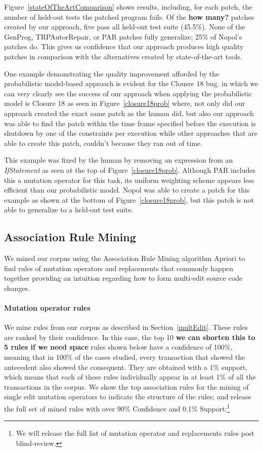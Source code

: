 \documentclass[conference]{IEEEtran}
\newcommand{\todo}[1]
  {{\scriptsize \textbf{\color{red} {#1}}}}
\begin{document}
Figure~\ref{stateOfTheArtComparison} shows results, including, for each patch,
the number of held-out tests the patched program fails. Of the \todo{how many?}
patches created by our approach, 
five pass all held-out test suite (45.5\%). None of the GenProg,
TRPAutorRepair, or PAR patches fully generalize; 25\% of Nopol's patches do.
This gives us confidence that our approach produces high
quality patches in comparison with the alternatives created by state-of-the-art
tools. 

One example demonstrating the quality improvement afforded by the probabilistic
model-based approach is evident for the Clousre 18 bug.  in which we can very clearly see the success of our approach when
applying the probabilistic model is Closure 18 as seen in
Figure~\ref{closure18prob} where, not only did our approach created the exact
same patch as the human did, but also our approach was able to find the patch
within the time frame specified before the execution is shutdown by one of the
constraints per execution while other approaches that are able to create this
patch, couldn't because they ran out of time.

This example was fixed by the human by removing an expression from an
\emph{IfStatement} as seen at the top of Figure~\ref{closure18prob}. 
Although PAR includes this a mutation operator for this task, its uniform
weighting scheme appears less efficient than our probabilistic model. Nopol was
able to create a patch for this example as shown at the bottom of 
Figure~\ref{closure18prob}, but this patch is not able to generalize to a
held-out test suite.

\subsection{Association Rule Mining} \label{armRes}

We mined our corpus using the Association Rule Mining algorithm Apriori 
to find rules of mutation operators and 
replacements that commonly happen together providing an intuition regarding
how to form multi-edit
source code changes.

\paragraph{Mutation operator rules}
We mine rules from our corpus as described in Section~\ref{multEdit}.  
These rules are ranked by their confidence. In this case, the top 10 \todo{we can shorten this to 5 rules if we need space} rules shown
below have a confidence of 100\%, meaning that in 100\% of the cases
studied, every transaction that showed the antecedent also showed the consequent.
They are obtained with a 1\% support, which means that each of these rules
individually appear in at least 1\% of all the transactions in the
corpus. We show the top association rules for the mining of single edit 
mutation operators to indicate the structure of the rules; and release the full set of mined
rules with over 90\% Confidence and 0.1\% Support:\footnote{We will release the full list of mutation operator and replacements rules post blind-review.} %
\end{document}

